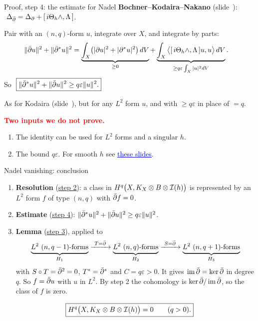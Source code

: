 \begin{frame}{Proof, step 4: the estimate for Nadel}
\label{fr:apply-estimate}
\textbf{Bochner--Kodaira--Nakano} (slide~\hyperlink{fr:the-bochner-kodaira-nakano-15}{\pageref{fr:the-bochner-kodaira-nakano-15}}): \(\ \Delta_{\db}=\Delta_{\partial}+[\,i\Theta_h\wedge,\Lambda\,]\).
\par\medskip
Pair with an \((n,q)\)-form \(u\), integrate over \(X\), and integrate by parts:
\[
\begin{aligned}
\lVert\bar\partial u\rVert^2+\lVert\bar\partial^*u\rVert^2
&=\underbrace{\int_X\bigl(|\partial u|^2+|\partial^*u|^2\bigr)\,dV}_{\ge0}
+\underbrace{\int_X\big\langle[\,i\Theta_h\wedge,\Lambda\,]u,u\big\rangle\,dV}_{\ge q\varepsilon\int_X|u|^2dV}.
\end{aligned}
\]
So \(\ \boxed{\norm{\db^*u}^2+\norm{\db u}^2\ge q\varepsilon\norm{u}^2.}\)
\par\smallskip
As for Kodaira (slide~\hyperlink{fr:kv-proof}{\pageref{fr:kv-proof}}), but for any \(L^2\) form \(u\), and with \(\ge q\varepsilon\) in place of \(=q\).
\par\smallskip
\textcolor{red}{\textbf{Two inputs we do not prove.}}
\begin{enumerate}
\item The identity can be used for \(L^2\) forms and a singular \(h\).
\item The bound \(q\varepsilon\). For smooth \(h\) see \href{https://github.com/danimalabares/tmp/blob/main/kodaira-lectures/archive/curvature-inequality/curvature-inequality.pdf}{\textcolor{blue}{\underline{these slides}}}.
\end{enumerate}
\end{frame}

\begin{frame}{Nadel vanishing: conclusion}
\begin{enumerate}
\setlength{\itemsep}{8pt}
\item \textbf{Resolution} (\hyperlink{fr:nadel-step2}{step 2}): a class in \(H^q\bigl(X,K_X\otimes B\otimes\mathcal I(h)\bigr)\) is represented by an \(L^2\) form \(f\) of type \((n,q)\) with \(\bar\partial f=0\).
\item \textbf{Estimate} (\hyperlink{fr:apply-estimate}{step 4}): \(\lVert\bar\partial^*u\rVert^2+\lVert\bar\partial u\rVert^2\ge q\varepsilon\lVert u\rVert^2\).
\item \textbf{Lemma} (\hyperlink{fr:nadel-step3}{step 3}), applied to
\[
\underbrace{L^2\ (n,q-1)\text{-forms}}_{H_1}\xrightarrow{\ T=\db\ }
\underbrace{L^2\ (n,q)\text{-forms}}_{H_2}\xrightarrow{\ S=\db\ }
\underbrace{L^2\ (n,q+1)\text{-forms}}_{H_3}
\]
with \(S\circ T=\bar\partial^2=0\), \(T^*=\bar\partial^*\) and \(C=q\varepsilon>0\). It gives \(\operatorname{im}\bar\partial=\ker\bar\partial\) in degree \(q\). So \(f=\bar\partial u\) with \(u\) in \(L^2\). By step 2 the cohomology is \(\ker\bar\partial/\operatorname{im}\bar\partial\), so the class of \(f\) is zero.
\end{enumerate}
\[
\boxed{H^q\bigl(X,K_X\otimes B\otimes\mathcal I(h)\bigr)=0\qquad(q>0).}
\]
\end{frame}

